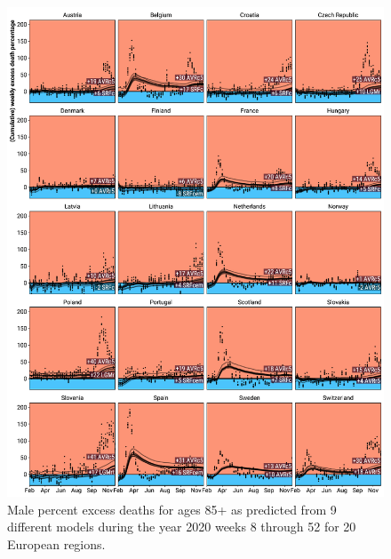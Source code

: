 \documentclass[12pt]{article}
\begin{document}
\begin{appendix}
\begin{figure}
\caption{
Male percent excess deaths for ages 85+ as predicted from 9 different models during the year 2020 weeks 8 through 52 for 20 European regions.}
\label{fig:excessm85plus}
\includegraphics{excess_male__85_inf_.pdf}
\end{figure}



\end{appendix}
\end{document}
